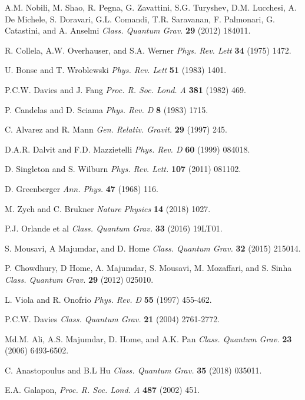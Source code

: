 \documentclass[%
 reprint,
 amsmath,amssymb,
 aps,
]{revtex4-1}
\begin{document}
\begin{thebibliography}{99}
A.M. Nobili, M. Shao, R. Pegna, G. Zavattini, S.G. Turyshev, D.M. Lucchesi, A. De Michele, S. Doravari, G.L. Comandi, T.R. Saravanan, F. Palmonari, G. Catastini, and A. Anselmi {\it Class. Quantum Grav.} {\bf 29} (2012) 184011. 

 R. Collela, A.W. Overhauser, and S.A. Werner {\it Phys. Rev. Lett} {\bf 34} (1975) 1472.

 U. Bonse and T. Wroblewski {\it Phys. Rev. Lett} {\bf 51} (1983) 1401.

 P.C.W. Davies and J. Fang {\it Proc. R. Soc. Lond. A} {\bf 381} (1982) 469.

 P. Candelas and D. Sciama {\it Phys. Rev. D} {\bf 8} (1983) 1715.

 C. Alvarez and R. Mann {\it Gen. Relativ. Gravit.} {\bf 29} (1997) 245.

 D.A.R. Dalvit and F.D. Mazzietelli {\it Phys. Rev. D} {\bf 60} (1999) 084018.

 D. Singleton and S. Wilburn {\it Phys. Rev. Lett.} {\bf 107} (2011) 081102.

 D. Greenberger {\it Ann. Phys.} {\bf 47} (1968) 116.

 M. Zych and C. Brukner {\it Nature Physics} {\bf 14} (2018) 1027.

 P.J. Orlande et al {\it Class. Quantum Grav.} {\bf 33} (2016) 19LT01.

 S. Mousavi, A Majumdar, and D. Home {\it Class. Quantum Grav.} {\bf 32} (2015) 215014.

 P. Chowdhury, D Home, A. Majumdar, S. Mousavi, M. Mozaffari, and S. Sinha {\it Class. Quantum Grav.} {\bf 29} (2012) 025010.

 L. Viola and R. Onofrio {\it Phys. Rev. D} {\bf 55} (1997) 455-462.

 P.C.W. Davies {\it Class. Quantum Grav.} {\bf 21} (2004) 2761-2772.

 Md.M. Ali, A.S. Majumdar, D. Home, and A.K. Pan {\it Class. Quantum Grav.} {\bf 23} (2006) 6493-6502.

 C. Anastopoulus and B.L Hu {\it Class. Quantum Grav.} {\bf 35} (2018) 035011.

 E.A. Galapon, {\em Proc. R. Soc. Lond. A} {\bf 487} (2002) 451. 


\end{thebibliography}
\end{document}
